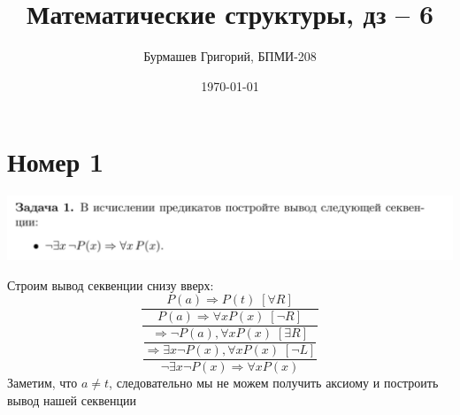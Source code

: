 \documentclass[a4paper,12pt]{article}
\author{Бурмашев Григорий, БПМИ-208}
\title{Математические структуры, дз -- 6}
\date{\today}
\begin{document}
\clearpage
\section*{Номер 1}
\begin{center}
\includegraphics[scale=0.6]{1.png}
\end{center}
Строим вывод секвенции снизу вверх:
\[
\dfrac{
P(a) \Rightarrow P(t) \; [\forall R]
}{
\dfrac{P(a) \Rightarrow \forall x P(x) \; [\neg R]}{
\dfrac{
\dfrac{
\Rightarrow \neg P(a), \forall x P(x) \; [\exists R]
}{
\Rightarrow \exists x \neg P(x), \forall x P(x) \;  [\neg L]
}
}
{
\neg \exists x \neg P(x) \Rightarrow \forall x P(x) 
}
}
}
\]
Заметим, что $a \neq t$, следовательно мы не можем получить аксиому и построить вывод нашей секвенции 
\end{document}
